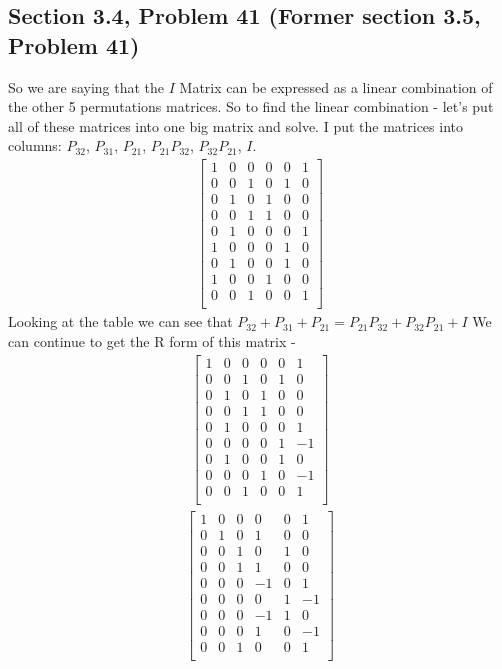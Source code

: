 \documentclass[a4paper,11pt]{article}
\begin{document}
\subsection*{Section 3.4, Problem 41  (Former section 3.5, Problem 41)}
So we are saying that the $I$ Matrix can be expressed as a linear combination of the other 5 permutations matrices. So to find the linear combination - let's put all of these matrices into one big matrix and solve.
I put the matrices into columns: $P_{32}$, $P_{31}$, $P_{21}$, $P_{21}P_{32}$, $P_{32}P_{21}$, $I$.
\begin{align}
\left[
\begin{array}{ccccc|c}
1 & 0 & 0 & 0 & 0 & 1  \\
0 & 0 & 1 & 0 & 1 & 0  \\
0 & 1 & 0 & 1 & 0 & 0  \\
0 & 0 & 1 & 1 & 0 & 0  \\
0 & 1 & 0 & 0 & 0 & 1  \\
1 & 0 & 0 & 0 & 1 & 0  \\
0 & 1 & 0 & 0 & 1 & 0  \\
1 & 0 & 0 & 1 & 0 & 0  \\
0 & 0 & 1 & 0 & 0 & 1  \\
\end{array}
\right]
\end{align}
Looking at the table we can see that $P_{32} + P_{31} + P_{21} = P_{21}P_{32} + P_{32}P_{21} + I$
We can continue to get the R form of this matrix - 
\begin{align}
\left[
\begin{array}{ccccc|c}
1 & 0 & 0 & 0 & 0 & 1  \\
0 & 0 & 1 & 0 & 1 & 0  \\
0 & 1 & 0 & 1 & 0 & 0  \\
0 & 0 & 1 & 1 & 0 & 0  \\
0 & 1 & 0 & 0 & 0 & 1  \\
0 & 0 & 0 & 0 & 1 & -1  \\
0 & 1 & 0 & 0 & 1 & 0  \\
0 & 0 & 0 & 1 & 0 & -1  \\
0 & 0 & 1 & 0 & 0 & 1  \\
\end{array}
\right]
\end{align}
\begin{align}
\left[
\begin{array}{ccccc|c}
1 & 0 & 0 & 0 & 0 & 1  \\
0 & 1 & 0 & 1 & 0 & 0  \\
0 & 0 & 1 & 0 & 1 & 0  \\
0 & 0 & 1 & 1 & 0 & 0  \\
0 & 0 & 0 & -1 & 0 & 1  \\
0 & 0 & 0 & 0 & 1 & -1  \\
0 & 0 & 0 & -1 & 1 & 0  \\
0 & 0 & 0 & 1 & 0 & -1  \\
0 & 0 & 1 & 0 & 0 & 1  \\
\end{array}
\right]
\end{align}
\end{document}
